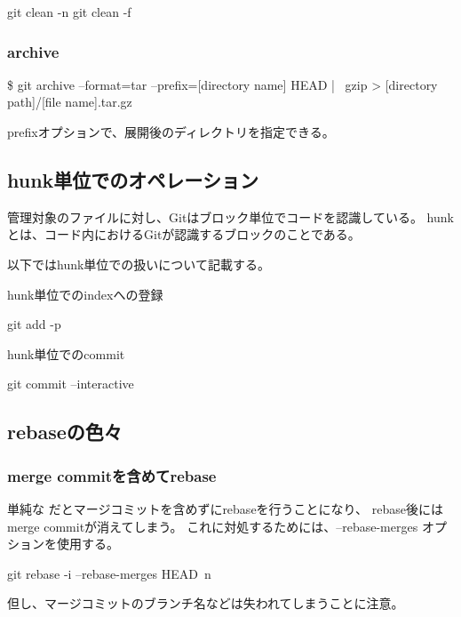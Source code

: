 \documentclass[10pt,a4j,openany,dvipdfmx]{jsarticle}
\begin{document}
\begin{commandshell}
git clean -n
git clean -f 
\end{commandshell}

\subsubsection{archive} %
\label{ssub:archive}

\$ git archive --format=tar --prefix=[directory name] HEAD | \
gzip > [directory path]/[file name].tar.gz

prefixオプションで、展開後のディレクトリを指定できる。

\subsection{hunk単位でのオペレーション} %
\label{sub:hunk単位でのオペレーション}

\begin{tcolorbox}[title=hunkとは, fonttitle=\bfseries]
管理対象のファイルに対し、Gitはブロック単位でコードを認識している。
hunkとは、コード内におけるGitが認識するブロックのことである。
\end{tcolorbox}

以下ではhunk単位での扱いについて記載する。

hunk単位でのindexへの登録
\begin{commandshell}
git add -p
\end{commandshell}

hunk単位でのcommit
\begin{commandshell}
git commit --interactive
\end{commandshell}


\subsection{rebaseの色々} %
\label{sub:rebaseの色々}

\subsubsection{merge commitを含めてrebase} %
\label{ssub:merge_commitを含めてrebase}

単純な だとマージコミットを含めずにrebaseを行うことになり、
rebase後にはmerge commitが消えてしまう。
これに対処するためには、--rebase-merges オプションを使用する。
\begin{commandshell}
git rebase -i --rebase-merges HEAD~n
\end{commandshell}
但し、マージコミットのブランチ名などは失われてしまうことに注意。
\end{document}
